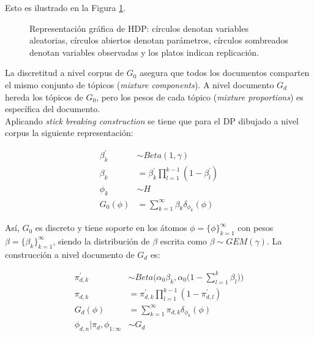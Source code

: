 \documentclass[letterpaper,12pt,oneside]{book} %
\begin{document}
Esto es ilustrado en la Figura \ref{img:hdp}.

\begin{figure}
  \centering
\caption{Representación gráfica de HDP: círculos denotan variables aleatorias, círculos abiertos denotan parámetros, círculos sombreados denotan variables observadas y los platos indican replicación.}
\label{img:hdp}
\end{figure}

La discretitud a nivel corpus de $G_{0}$ asegura que todos los documentos comparten el mismo conjunto de tópicos (\textit{mixture components}). A nivel documento $G_{d}$ hereda los tópicos de $G_{0}$, pero los pesos de cada tópico (\textit{mixture proportions}) es específica del documento.\\

Aplicando \textit{stick breaking construction} se tiene que para el DP dibujado a nivel corpus la siguiente representación:

\begin{align}
    \beta_{k}^{'} &\sim Beta(1, \gamma) \\
    \beta_{k} &= \beta_{k}^{'}\prod_{l=1}^{k-1}(1-\beta_{l}^{'})\\
    \phi_{k} &\sim H  \\
    G_{0}(\phi) &=\sum_{k=1}^{\infty}\beta_{k}\delta_{\phi_{k}}(\phi)
\end{align}

Así, $G_{0}$ es discreto y tiene soporte en los átomos $\phi = \{\phi\}_{k=1}^{\infty}$ con pesos $\beta=\{\beta_{k}\}_{k=1}^{\infty}$, siendo la distribución de $\beta$ escrita como $\beta \sim GEM(\gamma)$. La construcción a nivel documento de $G_{d}$ es:

\begin{align}
    \pi_{d,k}^{'} &\sim Beta\big(\alpha_{0}\beta_{k}, \alpha_{0}\big(1-\sum_{l=1}^{k}\beta_{l}\big)\big)\\
    \pi_{d,k} &= \pi_{d,k}^{'}\prod_{l=1}^{k-1}(1-\pi_{d,l}^{'})\\
    G_{d}(\phi) &=\sum_{k=1}^{\infty}\pi_{d,k}\delta_{\phi_{k}}(\phi)\\
    \phi_{d,n}|\pi_{d}, \phi_{1:\infty} &\sim G_{d}
\end{align}
\end{document}
